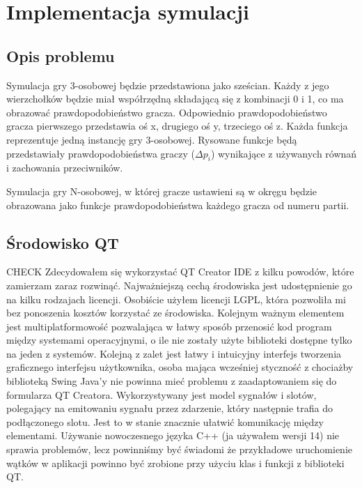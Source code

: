 \chapter{Implementacja symulacji}
\label{cha:implementacja}

\section{Opis problemu}
\label{sec:opis_problemu}
Symulacja gry 3-osobowej będzie przedstawiona jako sześcian. Każdy z jego wierzchołków będzie miał współrzędną składającą się z kombinacji 0 i 1, co ma obrazować prawdopodobieństwo gracza. Odpowiednio prawdopodobieństwo gracza pierwszego przedstawia oś x, drugiego oś y, trzeciego oś z. Każda funkcja reprezentuje jedną instancję gry 3-osobowej. Rysowane funkcje będą przedstawiały prawdopodobieństwa graczy ($\Delta p_i$) wynikające z używanych równań i zachowania przeciwników. 

Symulacja gry N-osobowej, w której gracze ustawieni są w okręgu będzie obrazowana jako funkcje prawdopodobieństwa każdego gracza od numeru partii.

\section{Środowisko QT}
\label{sec:qt}
{\color{red} CHECK}
Zdecydowałem się wykorzystać QT Creator IDE z kilku powodów, które zamierzam zaraz rozwinąć. Najważniejszą cechą środowiska jest udostępnienie go na kilku rodzajach licencji. Osobiście użyłem licencji LGPL, która pozwoliła mi bez ponoszenia kosztów korzystać ze środowiska. Kolejnym ważnym elementem jest multiplatformowość pozwalająca w łatwy sposób przenosić kod program między systemami operacyjnymi, o ile nie zostały użyte biblioteki dostępne tylko na jeden z systemów. Kolejną z zalet jest łatwy i intuicyjny interfejs tworzenia graficznego interfejsu użytkownika, osoba mająca wcześniej styczność z chociażby biblioteką Swing Java'y nie powinna mieć problemu z zaadaptowaniem się do  formularza QT Creatora. Wykorzystywany jest model sygnałów i slotów, polegający na emitowaniu sygnału przez zdarzenie, który następnie trafia do podłączonego slotu. Jest to w stanie znacznie ułatwić komunikację między elementami. Używanie nowoczesnego języka C++ (ja używałem wersji 14) nie sprawia problemów, lecz powinniśmy być świadomi że przykładowe uruchomienie wątków w aplikacji powinno być zrobione przy użyciu klas i funkcji z biblioteki QT.

